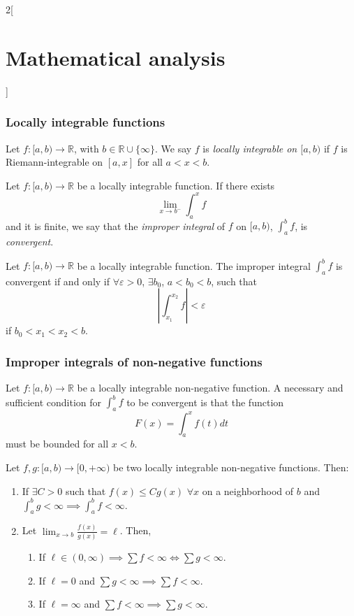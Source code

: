 \documentclass[class=article,crop=false]{standalone}
\begin{document}
\begin{multicols}{2}[\section{Mathematical analysis}]
\subsubsection{Locally integrable functions}
\begin{definition}
Let $f:[a,b)\rightarrow\mathbb{R}$, with $b\in\mathbb{R}\cup\{\infty\}$. We say $f$ is \textit{locally integrable on $[a,b)$} if $f$ is Riemann-integrable on $[a,x]$ for all $a<x<b$.
\end{definition}
\begin{definition}
Let $f:[a,b)\rightarrow\mathbb{R}$ be a locally integrable function. If there exists $$\lim_{x\to b^-}\int_a^x f$$ and it is finite, we say that the \textit{improper integral} of $f$ on $[a,b)$, $\displaystyle\int_a^b f$, is \textit{convergent}.
\end{definition}
\begin{theorem}
Let $f:[a,b)\rightarrow\mathbb{R}$ be a locally integrable function. The improper integral $\displaystyle\int_a^b f$ is convergent if and only if $\forall\varepsilon>0$, $\exists b_0$, $a<b_0<b$, such that $$\left|\int_{x_1}^{x_2} f\right|<\varepsilon$$ if $b_0<x_1<x_2<b$.
\end{theorem}
\subsubsection{Improper integrals of non-negative functions}
\begin{theorem}
Let $f:[a,b)\rightarrow\mathbb{R}$ be a locally integrable non-negative function. A necessary and sufficient condition for $\displaystyle\int_a^b f$ to be convergent is that the function $$F(x)=\displaystyle\int_a^x f(t)dt$$ must be bounded for all $x<b$.
\end{theorem}
\begin{theorem}
Let $f,g:[a,b)\rightarrow[0,+\infty)$ be two locally integrable non-negative functions. Then: 
\begin{enumerate}
    \item If $\exists C>0$ such that $f(x)\leq Cg(x)$ $\forall x$ on a neighborhood of $b$ and $\displaystyle\int_a^b g<\infty\implies\int_a^b f<\infty$.
    \item Let $\displaystyle\lim_{x\to b}\frac{f(x)}{g(x)}=\ell$. Then,
    \begin{enumerate}
        \item If $\ell\in(0,\infty)\implies\sum f<\infty\iff\sum g<\infty$.
        \item If $\ell=0$ and $\sum g<\infty\implies\sum f<\infty$.
        \item If $\ell=\infty$ and $\sum f<\infty\implies\sum g<\infty$.
    \end{enumerate}
\end{enumerate}
\end{theorem}

\end{multicols}
\end{document}
